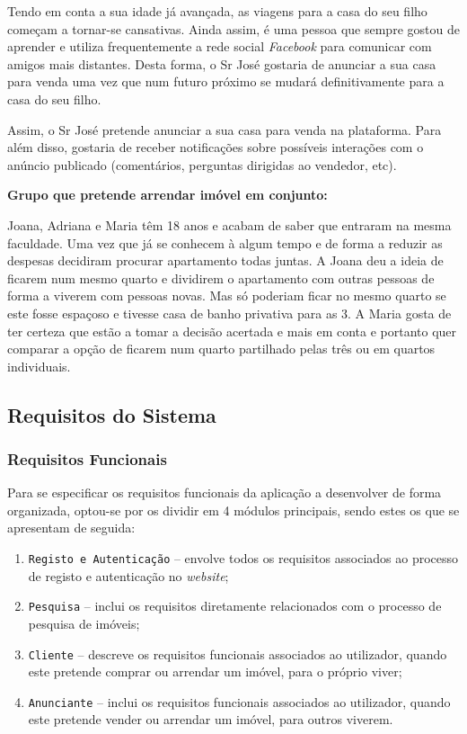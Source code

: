 Tendo em conta a sua idade já avançada, as viagens para a casa do seu filho começam a tornar-se cansativas. Ainda assim, é uma pessoa que sempre gostou de aprender e utiliza frequentemente a rede social \textit{Facebook} para comunicar com amigos mais distantes. Desta forma, o Sr José gostaria de anunciar a sua casa para venda uma vez que num futuro próximo se mudará definitivamente para a casa do seu filho.

Assim, o Sr José pretende anunciar a sua casa para venda na plataforma. Para além disso, gostaria de receber notificações sobre possíveis interações com o anúncio publicado (comentários, perguntas dirigidas ao vendedor, etc).

\vspace{0.4cm}
\noindent\textbf{Grupo que pretende arrendar imóvel em conjunto:}

Joana, Adriana e Maria têm 18 anos e acabam de saber que entraram na mesma faculdade. Uma vez que já se conhecem à algum tempo e de forma a reduzir as despesas decidiram procurar apartamento todas juntas. A Joana deu a ideia de ficarem num mesmo quarto e dividirem o apartamento com outras pessoas de forma a viverem com pessoas novas. Mas só poderiam ficar no mesmo quarto se este fosse espaçoso e tivesse casa de banho privativa para as 3. A Maria gosta de ter certeza que estão a tomar a decisão acertada e mais em conta e portanto quer comparar a opção de ficarem num quarto partilhado pelas três ou em quartos individuais.

\subsection{Requisitos do Sistema}

\subsubsection{Requisitos Funcionais}

Para se especificar os requisitos funcionais da aplicação a desenvolver de forma organizada, optou-se por os dividir em 4 módulos principais, sendo estes os que se apresentam de seguida:

\begin{enumerate}
    \item \texttt{Registo e Autenticação} -- envolve todos os requisitos associados ao processo de registo e autenticação no \textit{website};
    \item \texttt{Pesquisa} -- inclui os requisitos diretamente relacionados com o processo de pesquisa de imóveis;
    \item \texttt{Cliente} -- descreve os requisitos funcionais associados ao utilizador, quando este pretende comprar ou arrendar um imóvel, para o próprio viver;
    \item \texttt{Anunciante} -- inclui os requisitos funcionais associados ao utilizador, quando este pretende vender ou arrendar um imóvel, para outros viverem.
\end{enumerate}


